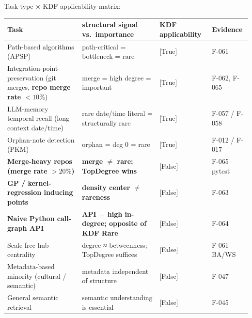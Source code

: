 Task type × KDF applicability matrix:

{\def\LTcaptype{none} %
\begin{longtable}[]{@{}
  >{\raggedright\arraybackslash}p{}
  >{\raggedright\arraybackslash}p{}
  >{\centering\arraybackslash}p{}
  >{\raggedright\arraybackslash}p{}@{}}
\toprule\noalign{}
\begin{minipage}[b]{\linewidth}\raggedright
Task
\end{minipage} & \begin{minipage}[b]{\linewidth}\raggedright
structural signal vs.~importance
\end{minipage} & \begin{minipage}[b]{\linewidth}\centering
KDF applicability
\end{minipage} & \begin{minipage}[b]{\linewidth}\raggedright
Evidence
\end{minipage} \\
\midrule\noalign{}
\endhead
\bottomrule\noalign{}
\endlastfoot
Path-based algorithms (APSP) & path-critical = bottleneck = rare & {[}True{]} & F-061 \\
Integration-point preservation (git merges, \textbf{repo merge rate \(< 10\%\)}) & merge = high degree = important & {[}True{]} & F-062, F-065 \\
LLM-memory temporal recall (long-context date/time) & rare date/time literal = structurally rare & {[}True{]} & F-057 / F-058 \\
Orphan-note detection (PKM) & orphan = deg \(0\) = rare & {[}True{]} & F-012 / F-017 \\
\textbf{Merge-heavy repos (merge rate \(> 20\%\))} & \textbf{merge \(\neq\) rare; TopDegree wins} & {[}False{]} & F-065 pytest \\
\textbf{GP / kernel-regression inducing points} & \textbf{density center \(\neq\) rareness} & {[}False{]} & F-063 \\
\textbf{Naive Python call-graph API} & \textbf{API = high in-degree; opposite of KDF Rare} & {[}False{]} & F-064 \\
Scale-free hub centrality & degree ≈ betweenness; TopDegree suffices & {[}False{]} & F-061 BA/WS \\
Metadata-based minority (cultural / semantic) & metadata independent of structure & {[}False{]} & F-047 \\
General semantic retrieval & semantic understanding is essential & {[}False{]} & F-045 \\
\end{longtable}
}

